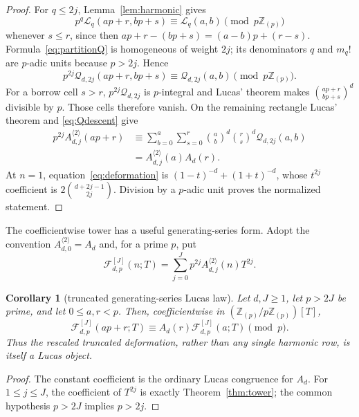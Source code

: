 \documentclass[11pt,reqno]{amsart}
\newtheorem{corollary}[theorem]{Corollary}
\theoremstyle{definition}
\theoremstyle{remark}
\newcommand{\Zp}{\mathbb Z_{(p)}}
\begin{document}
\begin{proof}
For $q\leq2j$, Lemma~\ref{lem:harmonic} gives
\[
 p^q\mathcal L_q(ap+r,bp+s)
 \equiv\mathcal L_q(a,b)\pmod {p\Zp}
\]
whenever $s\leq r$, since then
$ap+r-(bp+s)=(a-b)p+(r-s)$.  Formula~\eqref{eq:partitionQ} is homogeneous of
weight $2j$; its denominators $q$ and $m_q!$ are $p$-adic units because
$p>2j$.  Hence
\begin{equation}\label{eq:Qdescent}
 p^{2j}\mathcal Q_{d,2j}(ap+r,bp+s)
 \equiv\mathcal Q_{d,2j}(a,b)\pmod {p\Zp}.
\end{equation}
For a borrow cell $s>r$, $p^{2j}\mathcal Q_{d,2j}$ is $p$-integral and
Lucas' theorem makes $\binom{ap+r}{bp+s}^d$ divisible by $p$.  Those cells
therefore vanish.  On the remaining rectangle Lucas' theorem and
\eqref{eq:Qdescent} give
\begin{align*}
 p^{2j}A_{d,j}^{\langle2\rangle}(ap+r)
 &\equiv\sum_{b=0}^a\sum_{s=0}^r
   \binom ab^d\binom rs^d\mathcal Q_{d,2j}(a,b)\\
 &=A_{d,j}^{\langle2\rangle}(a)A_d(r).
\end{align*}
At $n=1$, equation~\eqref{eq:deformation} is
$(1-t)^{-d}+(1+t)^{-d}$, whose $t^{2j}$ coefficient is
$2\binom{d+2j-1}{2j}$.  Division by a $p$-adic unit proves the normalized
statement.
\end{proof}

The coefficientwise tower has a useful generating-series form.  Adopt the
convention $A_{d,0}^{\langle2\rangle}=A_d$ and, for a prime $p$, put
\begin{equation}\label{eq:truncatedFrob}
 \mathcal F_{d,p}^{[J]}(n;T)
 =\sum_{j=0}^{J}p^{2j}A_{d,j}^{\langle2\rangle}(n)T^{2j}.
\end{equation}

\begin{corollary}[truncated generating-series Lucas law]\label{cor:seriesLucas}
Let $d,J\geq1$, let $p>2J$ be prime, and let $0\leq a,r<p$.  Then, coefficientwise
in $(\Zp/p\Zp)[T]$,
\begin{equation}\label{eq:seriesLucas}
 \boxed{\displaystyle
 \mathcal F_{d,p}^{[J]}(ap+r;T)
 \equiv A_d(r)\mathcal F_{d,p}^{[J]}(a;T)\pmod p.}
\end{equation}
Thus the rescaled truncated deformation, rather than any single harmonic row,
is itself a Lucas object.
\end{corollary}

\begin{proof}
The constant coefficient is the ordinary Lucas congruence for $A_d$.  For
$1\leq j\leq J$, the coefficient of $T^{2j}$ is exactly
Theorem~\ref{thm:tower}; the common hypothesis $p>2J$ implies $p>2j$.
\end{proof}
\end{document}
